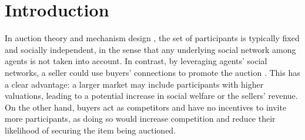\documentclass[letterpaper]{article} %
\theoremstyle{definition}
\begin{document}


\section{Introduction}

In auction theory and mechanism design \cite{Nisan2007}, the set of participants is typically %
fixed and socially independent, in the sense that any underlying social network among agents is not taken into account. In contrast, by leveraging agents' social networks, a seller could use buyers' connections to promote the auction \cite{guo2021emerging}. This has a clear advantage: a larger market may include participants with higher valuations, leading to a potential increase in social welfare or the sellers' revenue. On the other hand, buyers act as competitors and have no incentives to invite more participants, as doing so would increase competition and reduce their likelihood of securing the item being auctioned. %
\end{document}
